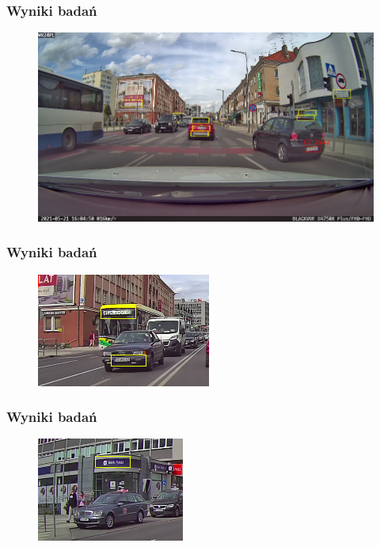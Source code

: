 \documentclass{beamer}
\begin{document}
    \begin{frame}
        \frametitle{Wyniki badań}
        \begin{figure}
            \includegraphics[scale=0.3]{../WIZUT-Dyplom-styl/Pictures/tablica_rozpoznana}
        \end{figure}
    \end{frame}

    \begin{frame}
        \frametitle{Wyniki badań}
        \begin{figure}
            \includegraphics[scale=0.6]{../WIZUT-Dyplom-styl/Pictures/autobus}
        \end{figure}
    \end{frame}

    \begin{frame}
        \frametitle{Wyniki badań}
        \begin{figure}
            \includegraphics[scale=0.6]{../WIZUT-Dyplom-styl/Pictures/bank}
        \end{figure}
    \end{frame}
\end{document}
